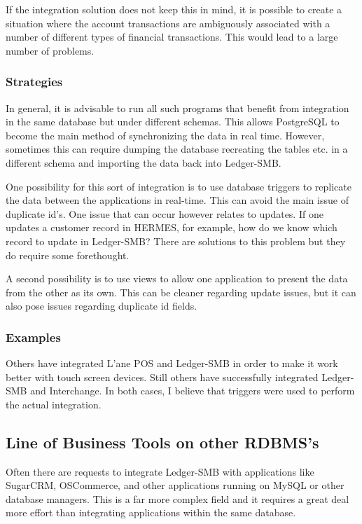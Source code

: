 \documentclass{article}
\begin{document}
If the integration solution does not keep this in mind, it is possible to create
a situation where the account transactions are ambiguously associated with a
number of different types of financial transactions.  This would lead to a large
number of problems.

\subsubsection{Strategies}
In general, it is advisable to run all such programs that benefit from
integration in the same database but under different schemas.  This allows
PostgreSQL to become the main method of synchronizing the data in real time.
However, sometimes this can require dumping the database recreating the tables
etc. in a different schema and importing the data back into Ledger-SMB.

One possibility for this sort of integration is to use database triggers to
replicate the data between the applications in real-time.  This can avoid the 
main issue of duplicate id's.  One issue that can occur however relates to
updates.  If one updates a customer record in HERMES, for example, how do we
know which record to update in Ledger-SMB?  There are solutions to this problem
but they do require some forethought.

A second possibility is to use views to allow one application to present the
data from the other as its own.  This can be cleaner regarding update issues,
but it can also pose issues regarding duplicate id fields.

\subsubsection{Examples}
Others have integrated L'ane POS and Ledger-SMB in order to make it work better
with touch screen devices.  Still others have successfully integrated Ledger-SMB
and Interchange.  In both cases, I believe that triggers were used to perform
the actual integration.

\subsection{Line of Business Tools on other RDBMS's}
Often there are requests to integrate Ledger-SMB with applications like
SugarCRM, OSCommerce, and other applications running on MySQL or other database
managers.  This is a far more complex field and it requires a great deal more
effort than integrating applications within the same database.
\end{document}
